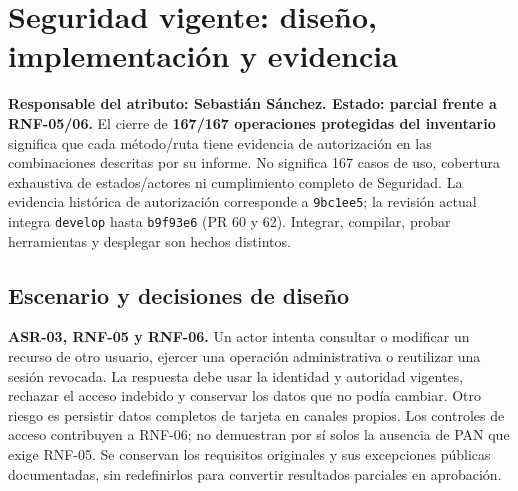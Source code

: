 \section{Seguridad vigente: diseño, implementación y evidencia}
\label{sec:seguridad-vigente}

\textbf{Responsable del atributo: Sebastián Sánchez. Estado: parcial frente a
RNF-05/06.} El cierre de \textbf{167/167 operaciones protegidas del inventario}
significa que cada método/ruta tiene evidencia de autorización en las
combinaciones descritas por su informe. No significa 167 casos de uso, cobertura
exhaustiva de estados/actores ni cumplimiento completo de Seguridad. La evidencia histórica de autorización corresponde a \texttt{9bc1ee5}; la revisión
actual integra \texttt{develop} hasta \texttt{b9f93e6} (PR 60 y 62). Integrar,
compilar, probar herramientas y desplegar son hechos distintos.

\subsection{Escenario y decisiones de diseño}
\textbf{ASR-03, RNF-05 y RNF-06.} Un actor intenta consultar o modificar un
recurso de otro usuario, ejercer una operación administrativa o reutilizar una
sesión revocada. La respuesta debe usar la identidad y autoridad vigentes,
rechazar el acceso indebido y conservar los datos que no podía cambiar. Otro
riesgo es persistir datos completos de tarjeta en canales propios. Los controles
de acceso contribuyen a RNF-06; no demuestran por sí solos la ausencia de PAN que
exige RNF-05. Se conservan los requisitos originales y sus excepciones públicas
documentadas, sin redefinirlos para convertir resultados parciales en aprobación.

